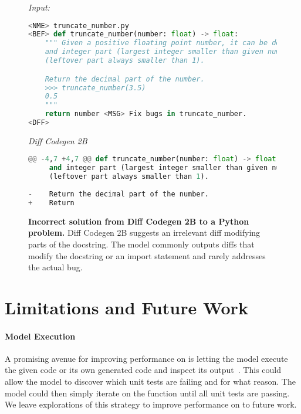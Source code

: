 \begin{figure}[htbp]
\hrulefill

\emph{Input:}

\hrulefill

\begin{lstlisting}[language=Python,breaklines=true,basicstyle=\ttfamily\scriptsize]
<NME> truncate_number.py
<BEF> def truncate_number(number: float) -> float:
    """ Given a positive floating point number, it can be decomposed into
    and integer part (largest integer smaller than given number) and decimals
    (leftover part always smaller than 1).

    Return the decimal part of the number.
    >>> truncate_number(3.5)
    0.5
    """
    return number <MSG> Fix bugs in truncate_number.
<DFF>
\end{lstlisting}

\hrulefill

\emph{Diff Codegen 2B}

\hrulefill

\begin{lstlisting}[language=Python,breaklines=true,basicstyle=\ttfamily\scriptsize]
@@ -4,7 +4,7 @@ def truncate_number(number: float) -> float:
     and integer part (largest integer smaller than given number) and decimals
     (leftover part always smaller than 1).
 
-    Return the decimal part of the number.
+    Return
\end{lstlisting}

\hrulefill

\caption{\textbf{Incorrect solution from Diff Codegen 2B to a \evalfd{} Python problem.} Diff Codegen 2B suggests an irrelevant diff modifying parts of the docstring. The model commonly outputs diffs that modify the docstring or an import statement and rarely addresses the actual bug.}
\label{fig:diffcodegenjava}
\end{figure}

\FloatBarrier


\section{Limitations and Future Work}
\label{sec:limitations}

\paragraph{Model Execution} A promising avenue for improving performance on \evalf{} is letting the model execute the given code or its own generated code and inspect its output~\citep{chen2022codet,chen2023teaching,yasunaga2021break,li2022transrepair,gao2023pal,dong2023self,zhang2023coder,madaan2023self,ni2023lever,gou2023critic,hu2023code,taylor2022galactica,nye2021show}. This could allow the model to discover which unit tests are failing and for what reason. The model could then simply iterate on the function until all unit tests are passing. We leave explorations of this strategy to improve performance on \eval{} to future work.


